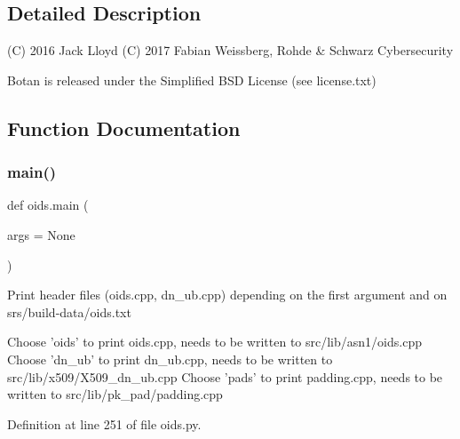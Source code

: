 \subsection{Detailed Description}
\begin{DoxyVerb}(C) 2016 Jack Lloyd
(C) 2017 Fabian Weissberg, Rohde & Schwarz Cybersecurity

Botan is released under the Simplified BSD License (see license.txt)
\end{DoxyVerb}
 

\subsection{Function Documentation}
\mbox{\label{namespaceoids_a7f49458c3a17f1edcc9d5fcf9b23c048}} 
\subsubsection{\texorpdfstring{main()}{main()}}
{\footnotesize\ttfamily def oids.\+main (\begin{DoxyParamCaption}\item[{}]{args = {\ttfamily None} }\end{DoxyParamCaption})}

\begin{DoxyVerb}Print header files (oids.cpp, dn_ub.cpp) depending on the first argument and on srs/build-data/oids.txt

    Choose 'oids' to print oids.cpp, needs to be written to src/lib/asn1/oids.cpp
    Choose 'dn_ub' to print dn_ub.cpp, needs to be written to src/lib/x509/X509_dn_ub.cpp
    Choose 'pads' to print padding.cpp, needs to be written to src/lib/pk_pad/padding.cpp
\end{DoxyVerb}
 

Definition at line 251 of file oids.\+py.

